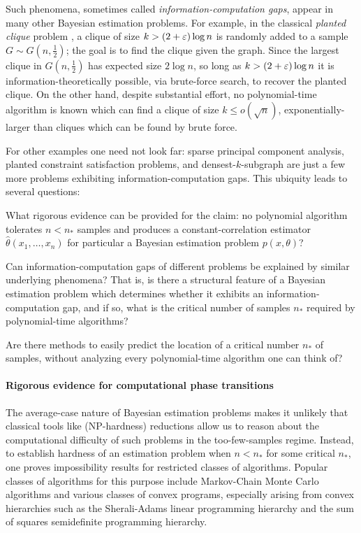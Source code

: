 Such phenomena, sometimes called \emph{information-computation gaps}, appear in many other Bayesian estimation problems.
For example, in the classical \emph{planted clique} problem \cite{DBLP:journals/rsa/Jerrum92, DBLP:journals/dam/Kucera95}, a clique of size $k > (2 + \varepsilon) \log n$ is randomly added to a sample $G \sim G(n,\tfrac 12)$; the goal is to find the clique given the graph.
Since the largest clique in $G(n,\tfrac 12)$ has expected size $2 \log n$, so long as $k > (2 + \varepsilon)\log n$ it is information-theoretically possible, via brute-force search, to recover the planted clique.
On the other hand, despite substantial effort, no polynomial-time algorithm is known which can find a clique of size $k \leq o(\sqrt n)$, exponentially-larger than cliques which can be found by brute force.

For other examples one need not look far: sparse principal component analysis, planted constraint satisfaction problems, and densest-$k$-subgraph are just a few more problems exhibiting information-computation gaps.
This ubiquity leads to several questions:
\begin{compactenum}
  \item What rigorous evidence can be provided for the claim: no polynomial algorithm tolerates $n < n_*$ samples and produces a constant-correlation estimator $\widehat{\theta}(x_1,\ldots,x_n)$ for particular a Bayesian estimation problem $p(x,\theta)$?
  \item Can information-computation gaps of different problems be explained by similar underlying phenomena? That is, is there a structural feature of a Bayesian estimation problem which determines whether it exhibits an information-computation gap, and if so, what is the critical number of samples $n_*$ required by polynomial-time algorithms?
  \item Are there methods to easily predict the location of a critical number $n_*$ of samples, without analyzing every polynomial-time algorithm one can think of?
\end{compactenum}

\paragraph{Rigorous evidence for computational phase transitions}
The average-case nature of Bayesian estimation problems makes it unlikely that classical tools like (NP-hardness) reductions allow us to reason about the computational difficulty of such problems in the too-few-samples regime.
Instead, to establish hardness of an estimation problem when $n < n_*$ for some critical $n_*$, one proves impossibility results for restricted classes of algorithms.
Popular classes of algorithms for this purpose include Markov-Chain Monte Carlo algorithms and various classes of convex programs, especially arising from convex hierarchies such as the Sherali-Adams linear programming hierarchy and the sum of squares semidefinite programming hierarchy.


